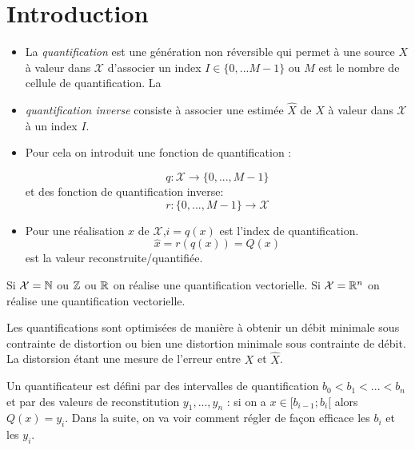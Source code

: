 \documentclass[main.tex]{subfiles}
\begin{document}
\newcommand{\Y}{\mathcal{Y}}
\newcommand{\X}{\mathcal{X}}
\section{Introduction}

\begin{defin}
  \begin{itemize}
  \item La \emph{quantification} est une génération non réversible qui permet à
    une source $X$ à valeur dans $\X$ d'associer un index $I\in\{0,...M-1\}$ ou
    $M$ est le nombre de cellule de quantification. La
  \item \emph{quantification inverse} consiste à associer une estimée $\hat{X}$ de $X$ à valeur dans $\X$ à un index $I$.
  \item
Pour cela on introduit une fonction de quantification :

\[
  q :\X \to \{0,...,M-1\}
\]
et des fonction de quantification inverse:
\[
  r :\{0,...,M-1\} \to \X
\]
\item Pour une réalisation $x$ de $\X$,$i = q(x)$ est l'index de quantification.
  \[
    \hat{x}= r(q(x)) = Q(x)
  \]
  est la valeur reconstruite/quantifiée.
  \end{itemize}
\end{defin}
\begin{rem}
  Si $\X = \N $ ou $\mathbb{Z}$ ou $\mathbb{R}$ on réalise une quantification vectorielle. Si $\X =\R^n$ on réalise une quantification vectorielle.
\end{rem}

Les quantifications sont optimisées de manière à obtenir un débit minimale sous contrainte de distortion ou bien une distortion minimale sous contrainte de débit. La distorsion étant une mesure de l'erreur entre $X$ et $\hat{X}$.

Un quantificateur est défini par des intervalles de quantification $b_0 < b_1 < ... < b_n$ et par des valeurs de reconstitution $y_1,...,y_n$ : si on a $x \in[b_{i-1} ; b_i[$ alors $Q(x) = y_i$.
Dans la suite, on va voir comment régler de façon efficace les $b_i$ et les $y_i$.
\end{document}
